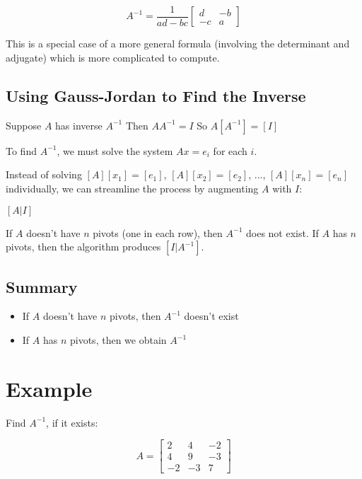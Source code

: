 \documentclass[12pt,a4paper]{article}
\begin{document}
\[A^{-1} = \frac{1}{ad-bc} \begin{bmatrix} d & -b \\ -c & a \end{bmatrix}\]

This is a special case of a more general formula (involving the determinant and adjugate) which is more complicated to compute.

\subsection{Using Gauss-Jordan to Find the Inverse}
Suppose $A$ has inverse $A^{-1}$
Then $AA^{-1} = I$
So $A[A^{-1}] = [I]$

To find $A^{-1}$, we must solve the system $Ax = e_i$ for each $i$.

Instead of solving $[A][x_1] = [e_1]$, $[A][x_2] = [e_2]$, ..., $[A][x_n] = [e_n]$ individually, we can streamline the process by augmenting $A$ with $I$:

$[A|I]$

If $A$ doesn't have $n$ pivots (one in each row), then $A^{-1}$ does not exist.
If $A$ has $n$ pivots, then the algorithm produces $[I|A^{-1}]$.

\subsection{Summary}
\begin{itemize}
    \item If $A$ doesn't have $n$ pivots, then $A^{-1}$ doesn't exist
    \item If $A$ has $n$ pivots, then we obtain $A^{-1}$
\end{itemize}

\section{Example}

Find $A^{-1}$, if it exists:

\[A = \begin{bmatrix} 2 & 4 & -2 \\ 4 & 9 & -3 \\ -2 & -3 & 7 \end{bmatrix}\]
\end{document}
